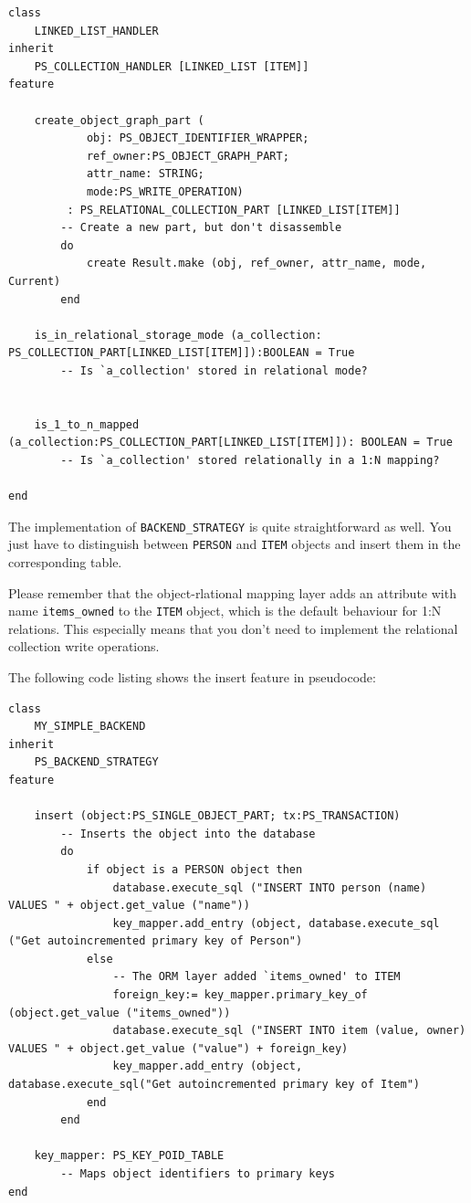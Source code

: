 \begin{lstlisting}[language=OOSC2Eiffel, captionpos=b, caption={The collection handler for LINKED\_LIST}, label={lst:my_linked_list_collection_handler}]
class 
	LINKED_LIST_HANDLER
inherit
	PS_COLLECTION_HANDLER [LINKED_LIST [ITEM]]
feature

	create_object_graph_part (
			obj: PS_OBJECT_IDENTIFIER_WRAPPER;
			ref_owner:PS_OBJECT_GRAPH_PART; 
			attr_name: STRING;
			mode:PS_WRITE_OPERATION)
		 : PS_RELATIONAL_COLLECTION_PART [LINKED_LIST[ITEM]]
		-- Create a new part, but don't disassemble
		do
			create Result.make (obj, ref_owner, attr_name, mode, Current)
		end

	is_in_relational_storage_mode (a_collection: PS_COLLECTION_PART[LINKED_LIST[ITEM]]):BOOLEAN = True
		-- Is `a_collection' stored in relational mode?


	is_1_to_n_mapped (a_collection:PS_COLLECTION_PART[LINKED_LIST[ITEM]]): BOOLEAN = True
		-- Is `a_collection' stored relationally in a 1:N mapping?

end
\end{lstlisting}


The implementation of \lstinline!BACKEND_STRATEGY! is quite straightforward as well.
You just have to distinguish between \lstinline!PERSON! and \lstinline!ITEM! objects and insert them in the corresponding table.

Please remember that the object-rlational mapping layer adds an attribute with name \lstinline!items_owned! to the \lstinline!ITEM! object, which is the default behaviour for 1:N relations.
This especially means that you don't need to implement the relational collection write operations.

The following code listing shows the insert feature in pseudocode:

\begin{lstlisting}[language=OOSC2Eiffel, captionpos=b, caption={The collection handler for LINKED\_LIST}, label={lst:my_backend_adaption}]
class 
	MY_SIMPLE_BACKEND
inherit
	PS_BACKEND_STRATEGY
feature

	insert (object:PS_SINGLE_OBJECT_PART; tx:PS_TRANSACTION)
		-- Inserts the object into the database
		do
			if object is a PERSON object then
				database.execute_sql ("INSERT INTO person (name) VALUES " + object.get_value ("name"))
				key_mapper.add_entry (object, database.execute_sql ("Get autoincremented primary key of Person")
			else
				-- The ORM layer added `items_owned' to ITEM
				foreign_key:= key_mapper.primary_key_of (object.get_value ("items_owned"))
				database.execute_sql ("INSERT INTO item (value, owner) VALUES " + object.get_value ("value") + foreign_key)
				key_mapper.add_entry (object, database.execute_sql("Get autoincremented primary key of Item")
			end
		end

	key_mapper: PS_KEY_POID_TABLE
		-- Maps object identifiers to primary keys
end
\end{lstlisting}

